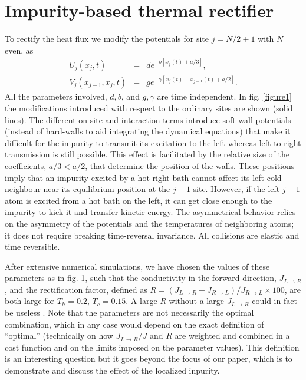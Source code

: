 \section{Impurity-based thermal rectifier}

To rectify the heat flux
we modify the potentials for site $j=N/2+1$ with $N$ even, as
%
%
\begin{eqnarray}
\label{IMP}
U_j(x_j,t)&=&d e^{-b [x_j(t)+a/3]},
\\
V_j(x_{j-1},x_j,t)&=&ge^{-\gamma [x_j(t)-x_{j-1}(t)+a/2]}.
\end{eqnarray}
%
All the parameters involved, $d, b$, and $g,\gamma$ are time independent. In fig. \ref{figure1} the modifications introduced with respect to the ordinary sites are shown (solid lines).  The different on-site and interaction terms introduce soft-wall potentials
(instead of hard-walls to aid integrating the dynamical equations) that make it difficult for the impurity to transmit its excitation to the left whereas left-to-right transmission is still possible.
This effect is facilitated by the relative size of the coefficients, $a/3<a/2$, that determine the position of the walls.
These positions imply that an impurity excited by a hot right bath cannot affect its left cold neighbour near its equilibrium position at the $j-1$ site.
However, if the left $j-1$ atom is excited from a hot bath on the left,
it can get close enough to the impurity to kick it and transfer kinetic energy.
The asymmetrical behavior relies on the asymmetry of the potentials and the temperatures of
neighboring atoms; it does not require
breaking time-reversal invariance. All collisions are elastic and time reversible.

After extensive numerical simulations, we have chosen the values of these parameters as in fig. 1, such that the conductivity in the forward direction, $J_{L\rightarrow R}$, and the rectification factor, defined as $R=(J_{L\rightarrow R}-J_{R\rightarrow L}) / J_{R\rightarrow L}\times 100$,
are both large for $T_h=0.2$, $T_c=0.15$. A large $R$ without a large $J_{L\rightarrow R}$ could in fact be useless \cite{Roberts2011}.
Note that the parameters are not necessarily the optimal combination, which in any case would depend on the exact definition of ``optimal'' (technically on how $J_{L\rightarrow R}/J$ and $R$ are weighted and combined in a cost function and on the limits imposed on the
parameter values). This definition is an interesting question but it goes beyond the focus of our paper,
which is to demonstrate and discuss the effect of the localized inpurity.

